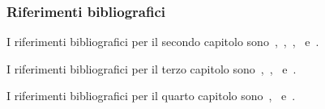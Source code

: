     \subsubsection{Riferimenti bibliografici}
    I riferimenti bibliografici per il secondo capitolo sono~\cite{landaumecc},~\cite{goldstein},~\cite{banados},~\cite{hill} e~\cite{bastianelli}.
    
    I riferimenti bibliografici per il terzo capitolo sono~\cite{banados},~\cite{landaucampi},~\cite{barone} e~\cite{weinberg}.

    I riferimenti bibliografici per il quarto capitolo sono~\cite{banados},~\cite{barone} e~\cite{weinberg}.
